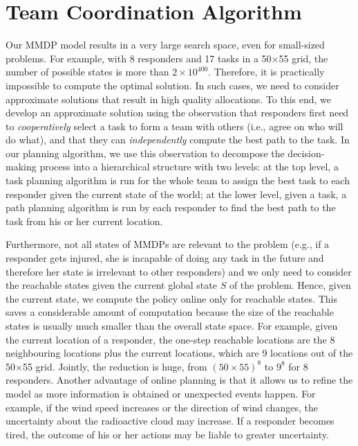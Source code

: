 \section{Team Coordination Algorithm}\label{sec:algo}
\noindent Our  MMDP model results in a very large search space,
even for small-sized problems. For example, with 8 responders and
17 tasks in a 50$\times$55 grid, the number of possible states is
more than $2\times 10^{400}$. Therefore, it is practically
impossible to compute the optimal solution. In such cases, we need
to consider approximate solutions that result in high quality
allocations.  To this end, we develop an
approximate solution using  the observation that responders first need to {\em cooperatively} select a
task to form a team with others (i.e., agree on who will do what),
and  that they can {\em independently} compute the best path to the task.
In our planning algorithm, we use this observation to decompose the
decision-making process into a hierarchical structure with two
levels: at the top level, a task planning algorithm is run for the
whole team to assign the best task to each responder given the
current state of the world; at the lower level, given a task, a
path planning algorithm is run by each responder to find the best
path to the task from his or her current location.

Furthermore, not all states of MMDPs are relevant to the problem
(e.g., if a responder gets injured, she is incapable of doing any
task in the future and therefore her state is irrelevant
to other responders) and we only need to consider the reachable
states given the current global state $S$ of the problem. Hence,
given the current state, we compute the policy online only for
reachable states. This saves a considerable amount of computation
because the size of the reachable states is usually much smaller
than the overall state space. For example, given the current
location of a responder, the one-step reachable locations are the 8
neighbouring locations plus the current locations, which are 9
locations out of the 50$\times$55 grid. Jointly, the reduction is
huge, from $(50\times 55)^8$ to $9^8$ for 8 responders. Another
advantage of online planning is that it allows us to refine the
model as more information is obtained or unexpected events happen.
For example, if the wind speed increases or the direction of wind
changes, the uncertainty about the radioactive cloud may increase.
If a responder becomes tired, the outcome of his or her actions may
be liable to greater uncertainty.

